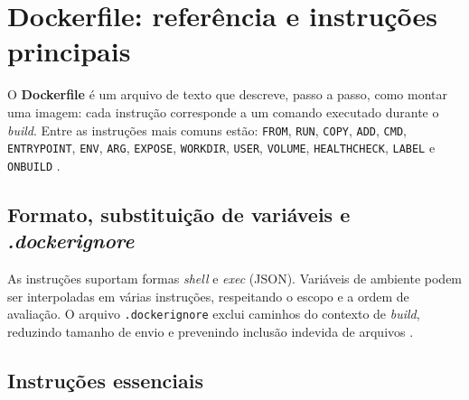 \section{Dockerfile: referência e instruções principais}
\label{sec:dockerfile}

O \textbf{Dockerfile} é um arquivo de texto que descreve, passo a passo, como montar uma imagem: cada instrução corresponde a um comando executado durante o \textit{build}. Entre as instruções mais comuns estão: \texttt{FROM}, \texttt{RUN}, \texttt{COPY}, \texttt{ADD}, \texttt{CMD}, \texttt{ENTRYPOINT}, \texttt{ENV}, \texttt{ARG}, \texttt{EXPOSE}, \texttt{WORKDIR}, \texttt{USER}, \texttt{VOLUME}, \texttt{HEALTHCHECK}, \texttt{LABEL} e \texttt{ONBUILD} \cite{dockerfile_ref}. 

\subsection{Formato, substituição de variáveis e \textit{.dockerignore}}
\label{subsec:dockerfile-format}

As instruções suportam formas \textit{shell} e \textit{exec} (JSON). Variáveis de ambiente podem ser interpoladas em várias instruções, respeitando o escopo e a ordem de avaliação. O arquivo \texttt{.dockerignore} exclui caminhos do contexto de \textit{build}, reduzindo tamanho de envio e prevenindo inclusão indevida de arquivos \cite{dockerfile_ref}. 

\subsection{Instruções essenciais}
\label{subsec:dockerfile-core}

